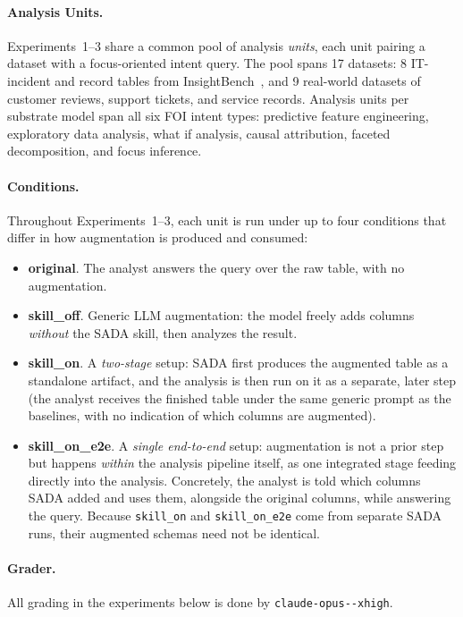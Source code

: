 \paragraph{Analysis Units.} Experiments~1--3 share a common pool of analysis \emph{units}, each unit pairing a dataset with a focus-oriented intent query. The pool spans 17 datasets: 8 IT-incident and record tables from InsightBench~\citep{insightbench2024}, and 9 real-world datasets of customer reviews, support tickets, and service records. Analysis units per substrate model span all six FOI intent types: predictive feature engineering, exploratory data analysis, what if analysis, causal attribution, faceted decomposition, and focus inference.

\paragraph{Conditions.} Throughout Experiments~1--3, each unit is run under up to four conditions that differ in how augmentation is produced and consumed:
\begin{itemize}
\item \textbf{original}. The analyst answers the query over the raw table, with no augmentation. 
\item \textbf{skill\_off}. Generic LLM augmentation: the model freely adds columns \emph{without} the SADA skill, then analyzes the result.
\item \textbf{skill\_on}. A \emph{two-stage} setup: SADA first produces the augmented table as a standalone artifact, and the analysis is then run on it as a separate, later step (the analyst receives the finished table under the same generic prompt as the baselines, with no indication of which columns are augmented).
\item \textbf{skill\_on\_e2e}. A \emph{single end-to-end} setup: augmentation is not a prior step but happens \emph{within} the analysis pipeline itself, as one integrated stage feeding directly into the analysis. Concretely, the analyst is told which columns SADA added and uses them, alongside the original columns, while answering the query. Because \texttt{skill\_on} and \texttt{skill\_on\_e2e} come from separate SADA runs, their augmented schemas need not be identical.
\end{itemize}

\paragraph{Grader.} All grading in the experiments below is done by \texttt{claude-\allowbreak opus--\allowbreak xhigh}.

